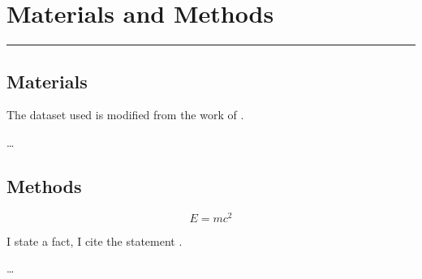 \chapter{Materials and Methods}

\lhead{}

\vspace{-1.6cm}
\begingroup
\color{gray}
\par\noindent\rule{\textwidth}{0.4pt}
\endgroup


\section{Materials}

The dataset used is modified from the work of \cite{Author2025}.

\ldots


\section{Methods}

\begin{equation}
    E = mc^2
    \label{eq:example}
\end{equation}

I state a fact, I cite the statement \citep{Author1999}.

\ldots
